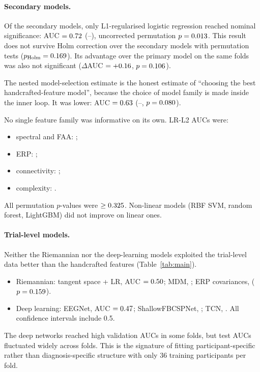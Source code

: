 \paragraph{Secondary models.} Of the secondary models, only L1-regularised logistic regression reached nominal
significance: AUC $=0.72$ (\LrLAllAucLo--\LrLAllAucHi), uncorrected permutation $p=0.013$. This result
does not survive Holm correction over the \NSecondaryHolm{} secondary models with permutation tests
($p_\text{Holm}=0.169$). Its advantage over the primary model on the same folds was also not significant
($\Delta$AUC $=+0.16$, $p=0.106$).

The nested model-selection estimate is the honest estimate of ``choosing the best handcrafted-feature model'',
because the choice of model family is made inside the inner loop. It was lower: AUC $=0.63$
(\NestedmodelselectionAllAucLo--\NestedmodelselectionAllAucHi, $p=0.080$).

No single feature family was informative on its own. LR-L2 AUCs were:
\begin{itemize}
  \item spectral and FAA: \LrLSpectralAuc;
  \item ERP: \LrLErpAuc;
  \item connectivity: \LrLConnectivityAuc;
  \item complexity: \LrLComplexityAuc.
\end{itemize}
All permutation $p$-values were $\geq0.325$. Non-linear models (RBF SVM, random forest, LightGBM) did
not improve on linear ones.

\paragraph{Trial-level models.} Neither the Riemannian nor the deep-learning models exploited the trial-level data
better than the handcrafted features (Table~\ref{tab:main}).
\begin{itemize}
  \item Riemannian: tangent space + LR, AUC $=0.50$; MDM, \MdmAuc; ERP covariances, \ErpcovTsLrAuc{}
        ($p=0.159$).
  \item Deep learning: EEGNet, AUC $=0.47$; ShallowFBCSPNet, \DlShallowfbcspnetAuc; TCN, \DlTcnAuc.
        All confidence intervals include 0.5.
\end{itemize}
The deep networks reached high validation AUCs in some folds, but test AUCs fluctuated widely across folds. This is
the signature of fitting participant-specific rather than diagnosis-specific structure with only 36 training
participants per fold.

